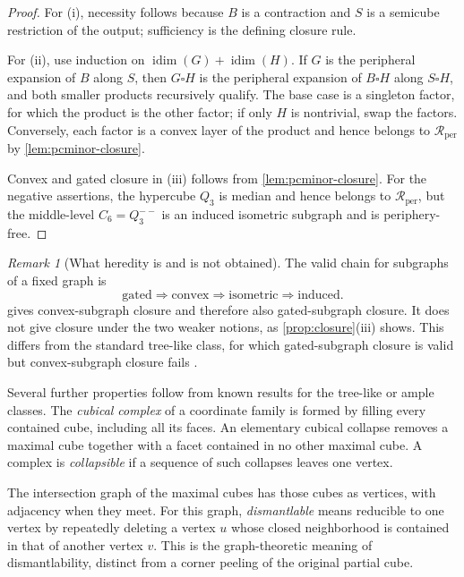 \documentclass[11pt]{article}
\theoremstyle{definition}
\theoremstyle{remark}
\newtheorem{remark}[theorem]{Remark}
\newcommand{\Rper}{\mathcal R_{\mathrm{per}}}
\newcommand{\idim}{\operatorname{idim}}
\begin{document}
\begin{proof}
For (i), necessity follows because \(B\) is a contraction and \(S\) is a
semicube restriction of the output; sufficiency is the defining closure
rule.

For (ii), use induction on \(\idim(G)+\idim(H)\).  If \(G\) is the
peripheral expansion of \(B\) along \(S\), then \(G\square H\) is the
peripheral expansion of \(B\square H\) along \(S\square H\), and both
smaller products recursively qualify.  The base case is a singleton factor,
for which the product is the other factor; if only \(H\) is nontrivial, swap
the factors.  Conversely, each factor is a convex layer of the product and
hence belongs to \(\Rper\) by \cref{lem:pcminor-closure}.

Convex and gated closure in (iii) follows from
\cref{lem:pcminor-closure}.  For the negative assertions, the hypercube
\(Q_3\) is median and hence belongs to \(\Rper\), but
the middle-level \(C_6=Q_3^{--}\) is an induced isometric subgraph and is
periphery-free.
\end{proof}

\begin{remark}[What heredity is and is not obtained]
The valid chain for subgraphs of a fixed graph is
\[
 \text{gated}\Longrightarrow\text{convex}
 \Longrightarrow\text{isometric}\Longrightarrow\text{induced}.
\]
 gives convex-subgraph closure and therefore also
gated-subgraph closure.  It does not give closure under the two weaker
notions, as \cref{prop:closure}(iii) shows.  This differs from the standard
tree-like class, for which gated-subgraph closure is valid but
convex-subgraph closure fails \cite{Gologranc14treehamming}.
\end{remark}

Several further properties follow from known results for the tree-like or
ample classes. The \emph{cubical complex} of a coordinate family is formed
by filling every contained cube, including all its faces. An elementary
cubical collapse removes a maximal cube together with a facet contained in
no other maximal cube. A complex is \emph{collapsible} if a sequence of such
collapses leaves one vertex.

The intersection graph of the maximal cubes has those cubes as vertices,
with adjacency when they meet. For this graph, \emph{dismantlable} means
reducible to one vertex by repeatedly deleting a vertex \(u\) whose closed
neighborhood is contained in that of another vertex \(v\). This is the
graph-theoretic meaning of dismantlability, distinct from a corner peeling
of the original partial cube.
\end{document}
